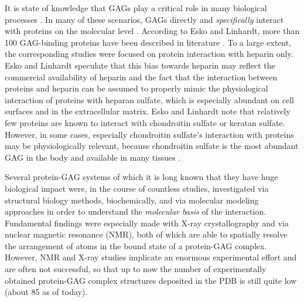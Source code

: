 It is state of knowledge that GAGs play a critical role in many biological
processes \cite{handel_2005}. In many of these scenarios, GAGs directly and
\textit{specifically} interact with proteins on the molecular level
\cite{prot_gags_glycomics_review_2006}. According to Esko and Linhardt, more
than 100 GAG-binding proteins have been described in literature
\cite{essentials_glycobiology_protgags_2009}. To a large extent, the
corresponding studies were focused on protein interaction with heparin only.
Esko and Linhardt speculate that this bias towards heparin may reflect the
commercial availability of heparin and the fact that the interaction between
proteins and heparin can be assumed to properly mimic the physiological
interaction of proteins with heparan sulfate, which is especially abundant on
cell surfaces and in the extracellular matrix. Esko and Linhardt note that
relatively few proteins are known to interact with chondroitin sulfate or
keratan sulfate. However, in some cases, especially chondroitin sulfate's
interaction with proteins may be physiologically relevant, because chondroitin
sulfate is the most abundant GAG in the body
\cite{gandhi_structure_2008} and available in many tissues
\cite{essentials_glycobiology_protgags_2009}.

Several protein-GAG systems of which it is long known that they have huge
biological impact were, in the course of countless studies, investigated via
structural biology methods, biochemically, and via molecular modeling approaches
in order to understand the \textit{molecular basis} of the interaction.
Fundamental findings were especially made with X-ray crystallography and via
nuclear magnetic resonance (NMR), both of which are able to spatially resolve
the arrangement of atoms in the bound state of a protein-GAG complex. However,
NMR and X-ray studies implicate an enormous experimental effort and are often
not successful, so that up to now the number of experimentally obtained
protein-GAG complex structures deposited in the PDB is still quite low (about
85 as of today).



